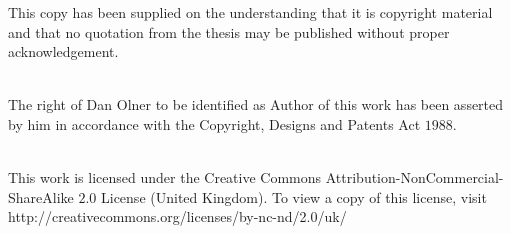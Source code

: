 This copy has been supplied on the understanding that it is copyright material and that no quotation from the thesis may be published without proper acknowledgement.


\vspace{1cm}\\


The right of Dan Olner to be identified as Author of this work has been asserted by him in accordance with the Copyright, Designs and Patents Act $1988$.

\begin{center}

\vspace{2cm}\\

This  work  is  licensed  under  the  Creative Commons Attribution-NonCommercial-ShareAlike $2.0$ License (United Kingdom). 
To  view  a  copy  of  this  license,  visit http://creativecommons.org/licenses/by-nc-nd/2.0/uk/


\end{center}








\clearpage{\pagestyle{empty}\cleardoublepage}


\thispagestyle{empty}


